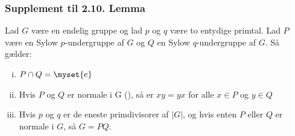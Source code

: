 \subsubsection{Supplement til 2.10. Lemma}
Lad $G$ være en endelig gruppe og lad $p$ og $q$ være to entydige primtal. Lad
$P$ være en Sylow $p$-undergruppe af $G$ og $Q$ en Sylow $q$-undergruppe af $G$.
Så gælder:
\begin{enumerate}[(i)]
  \item $P \cap Q = \myset{e}$
  \item Hvis $P$ og $Q$ er normale i G (), så er $xy = yx$ for alle
  $x \in P$ og $y \in Q$
  \item Hvis $p$ og $q$ er de eneste primdivisorer af $|G|$, og hvis enten $P$
  eller $Q$ er normale i $G$, så $G = PQ$.
\end{enumerate}

\newpage